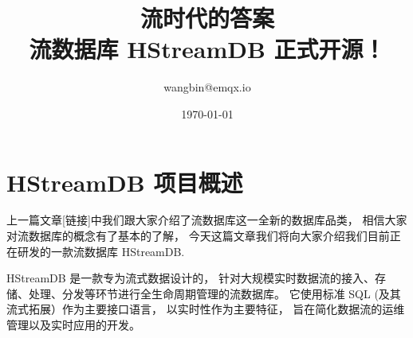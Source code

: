 \documentclass{ctexart}
\title{流时代的答案 \\
       流数据库 HStreamDB 正式开源！}
\author{wangbin@emqx.io}
\date{\today}
\begin{document}
\maketitle

\section{HStreamDB 项目概述}


上一篇文章[链接]中我们跟大家介绍了流数据库这一全新的数据库品类，
相信大家对流数据库的概念有了基本的了解，
今天这篇文章我们将向大家介绍我们目前正在研发的一款流数据库 HStreamDB.

HStreamDB 是一款专为流式数据设计的，
针对大规模实时数据流的接入、存储、处理、分发等环节进行全生命周期管理的流数据库。
它使用标准 SQL (及其流式拓展）作为主要接口语言，
以实时性作为主要特征，
旨在简化数据流的运维管理以及实时应用的开发。
\end{document}
